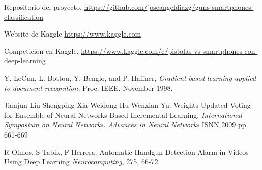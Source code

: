 % 

\begin{thebibliography}{99}

	\emph{} Repositorio del proyecto. \url{https://github.com/joseangeldiazg/guns-smartphones-classification}

	\emph{} Website de Kaggle \url{https://www.kaggle.com}	

	\emph{} Competicion en Kaggle. \url{https://www.kaggle.com/c/pistolas-vs-smartphones-con-deep-learning}
	
	\emph{}Y. LeCun, L. Bottou, Y. Bengio, and P. Haffner, \textit{Gradient-based learning applied to document recognition}, Proc. IEEE, November 1998.	
	
	\emph{} Jianjun Liu Shengping Xia Weidong Hu Wenxian Yu. Weights Updated Voting for Ensemble of Neural Networks Based Incremental Learning. \textit{International Symposium on Neural Networks. Advances in Neural Networks} ISNN 2009 pp 661-669
	
	\emph{}R Olmos, S Tabik, F Herrera. Automatic Handgun Detection Alarm in Videos Using Deep Learning  \textit{Neurocomputing}, 275, 66-72
	
\end{thebibliography}
